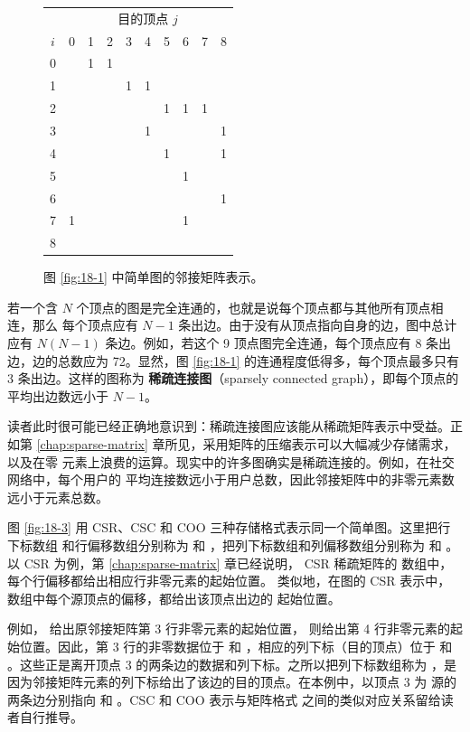\begin{figure}[htbp]
  \centering
  \scriptsize
  \setlength{\tabcolsep}{4.2pt}
  \renewcommand{\arraystretch}{1.15}
  \begin{tabular}{c|*{9}{c|}}
    \multicolumn{1}{c}{\raisebox{0.5ex}{源}} &
    \multicolumn{9}{c}{目的顶点 $j$}\\
    $i$ & 0&1&2&3&4&5&6&7&8\\ \hline
    0&&1&1&&&&&&\\ \hline
    1&&&&1&1&&&&\\ \hline
    2&&&&&&1&1&1&\\ \hline
    3&&&&&1&&&&1\\ \hline
    4&&&&&&1&&&1\\ \hline
    5&&&&&&&1&&\\ \hline
    6&&&&&&&&&1\\ \hline
    7&1&&&&&&1&&\\ \hline
    8&&&&&&&&&\\ \hline
  \end{tabular}
  \caption{图 \ref{fig:18-1} 中简单图的邻接矩阵表示。}
  \label{fig:18-2}
\end{figure}

若一个含 $N$ 个顶点的图是完全连通的，也就是说每个顶点都与其他所有顶点相连，那么
每个顶点应有 $N-1$ 条出边。由于没有从顶点指向自身的边，图中总计应有
$N(N-1)$ 条边。例如，若这个 9 顶点图完全连通，每个顶点应有 8 条出边，边的总数应为
72。显然，图 \ref{fig:18-1} 的连通程度低得多，每个顶点最多只有 3 条出边。这样的图称为
\textbf{稀疏连接图}（sparsely connected graph），即每个顶点的平均出边数远小于
$N-1$。

读者此时很可能已经正确地意识到：稀疏连接图应该能从稀疏矩阵表示中受益。正如第
\ref{chap:sparse-matrix} 章所见，采用矩阵的压缩表示可以大幅减少存储需求，以及在零
元素上浪费的运算。现实中的许多图确实是稀疏连接的。例如，在社交网络中，每个用户的
平均连接数远小于用户总数，因此邻接矩阵中的非零元素数远小于元素总数。

图 \ref{fig:18-3} 用 CSR、CSC 和 COO 三种存储格式表示同一个简单图。这里把行下标数组
和行偏移数组分别称为  和 ，把列下标数组和列偏移数组分别称为
 和 。以 CSR 为例，第 \ref{chap:sparse-matrix} 章已经说明，
CSR 稀疏矩阵的  数组中，每个行偏移都给出相应行非零元素的起始位置。
类似地，在图的 CSR 表示中， 数组中每个源顶点的偏移，都给出该顶点出边的
起始位置。

例如， 给出原邻接矩阵第 3 行非零元素的起始位置，
 则给出第 4 行非零元素的起始位置。因此，第 3 行的非零数据位于
 和 ，相应的列下标（目的顶点）位于  和
。这些正是离开顶点 3 的两条边的数据和列下标。之所以把列下标数组称为
，是因为邻接矩阵元素的列下标给出了该边的目的顶点。在本例中，以顶点 3 为
源的两条边分别指向  和 。CSC 和 COO 表示与矩阵格式
之间的类似对应关系留给读者自行推导。

